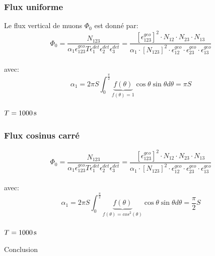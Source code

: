 \documentclass[a4paper,11pt,liststotocnumbered,bibtotocnumbered]{scrartcl}
\begin{document}
   \subsubsection{Flux uniforme}
Le flux vertical de muons $\Phi_0$ est donné par:
\begin{equation*}
\Phi_0=\frac{N_{123}}{\alpha_1 \epsilon_{123}^{geo}T\epsilon_{1}^{det}\epsilon_{2}^{det}\epsilon_{3}^{det}}=\frac{[\epsilon_{123}^{geo}]^2 \cdot N_{12}\cdot N_{23}\cdot N_{13}}{\alpha_1 \cdot [N_{123}]^2 \cdot \epsilon_{12}^{geo}\cdot \epsilon_{23}^{geo}\cdot \epsilon_{13}^{geo}}
\end{equation*}\\
avec:\\
\begin{equation*}
\alpha_1=2\pi S\int_0^{\frac{\pi}{2}}\underbrace{f(\theta)}_{\text{$f(\theta)=1$} }\cos\theta \sin\theta d \theta=\pi S
\end{equation*}\\
$T=\unit[1000]{s}$
    

   \subsubsection{Flux cosinus carré}
\begin{equation*}
\Phi_0=\frac{N_{123}}{\alpha_1 \epsilon_{123}^{geo}T\epsilon_{1}^{det}\epsilon_{2}^{det}\epsilon_{3}^{det}}=\frac{[\epsilon_{123}^{geo}]^2 \cdot N_{12}\cdot N_{23}\cdot N_{13}}{\alpha_1 \cdot [N_{123}]^2 \cdot \epsilon_{12}^{geo}\cdot \epsilon_{23}^{geo}\cdot \epsilon_{13}^{geo}}
\end{equation*}\\
avec:\\
\begin{equation*}
\alpha_1=2\pi S\int_0^{\frac{\pi}{2}}\underbrace{f(\theta)}_{\text{$f(\theta)=cos^2(\theta)$} }\cos\theta \sin\theta d \theta=\frac{\pi}{2} S
\end{equation*}\\
$T=\unit[1000]{s}$


 \begin{section}{Conclusion}
  
 \end{section}
 
 \begin{appendix}
  
    

  \listoffigures  
 \end{appendix}
\end{document}
